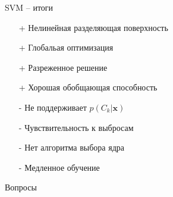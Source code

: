 \documentclass[aspectratio=169]{beamer}
\begin{document}
\begin{frame}{SVM -- итоги}

\begin{itemize}
\item[+] Нелинейная разделяющая поверхность
\item[+] Глобальая оптимизация
\item[+] Разреженное решение
\item[+] Хорошая обобщающая способность
\item[-] Не поддерживает $p(C_k | \mathbf x)$
\item[-] Чувствительность к выбросам
\item[-] Нет алгоритма выбора ядра
\item[-] Медленное обучение
\end{itemize}

\end{frame}

\begin{frame}{}

\begin{center}
\Large Вопросы
\end{center}

\end{frame}
\end{document}
